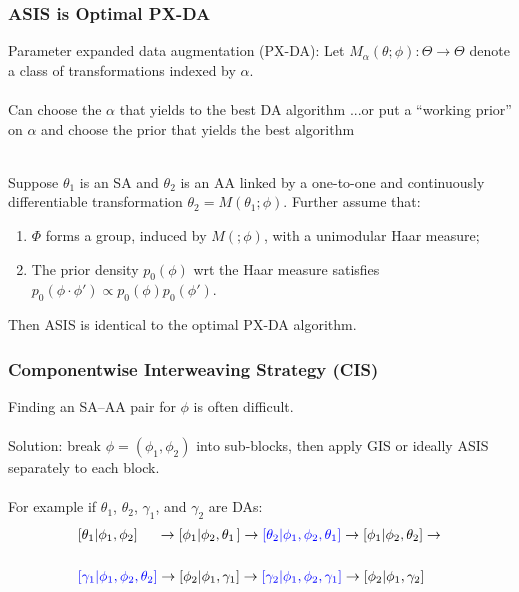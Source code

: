 \documentclass[xcolor=dvipsnames]{beamer}
\begin{document}
\begin{frame}
\frametitle{ASIS is Optimal PX-DA}
Parameter expanded data augmentation (PX-DA): Let $M_\alpha(\theta;\phi):\Theta\to\Theta$ denote a class of transformations indexed by $\alpha$.\\~\\

Can choose the $\alpha$ that yields to the best DA algorithm \citep{meng1999seeking}...\pause or put a ``working prior'' on $\alpha$ and choose the prior that yields the best algorithm \citep{meng1999seeking,liu1999parameter}\\~\\


\begin{theorem}
Suppose $\theta_1$ is an SA and $\theta_2$ is an AA linked by a one-to-one and continuously differentiable transformation $\theta_2=M(\theta_1;\phi)$. Further assume that:
\begin{enumerate}
\item $\Phi$ forms a group, induced by $M(;\phi)$, with a unimodular Haar measure;
\item The prior density $p_0(\phi)$ wrt the Haar measure satisfies $p_0(\phi\cdot\phi')\propto p_0(\phi)p_0(\phi')$.
\end{enumerate}
Then ASIS is identical to the optimal PX-DA algorithm.
\end{theorem}
\end{frame}

\begin{frame}
\frametitle{Componentwise Interweaving Strategy (CIS)}
Finding an SA--AA pair for $\phi$ is often difficult.\\~\\

Solution: break $\phi=(\phi_1,\phi_2)$ into sub-blocks, then apply GIS or ideally ASIS separately to each block.\\~\\

For example if $\theta_1$, $\theta_2$, $\gamma_1$, and $\gamma_2$ are DAs:\\

\begin{align*}
&[\theta_1|\phi_1,\phi_2]\phantom{\theta_2,}\hspace{.06cm} \to [\phi_1|\phi_2,\theta_1\hspace{.05cm}] \to {\color{blue}[\theta_2|\phi_1,\phi_2,\theta_1]} \to [\phi_1|\phi_2,\theta_2]\to\\
&\\
&{\color{blue}[\gamma_1|\phi_1,\phi_2,\theta_2]} \to [\phi_2|\phi_1,\gamma_1] \to {\color{blue}[\gamma_2|\phi_1,\phi_2,\gamma_1]} \to [\phi_2|\phi_1,\gamma_2]\\
\end{align*}

\end{frame}
\end{document}
